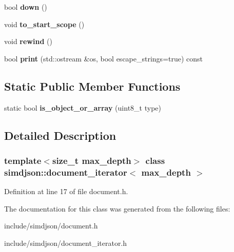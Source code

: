 \begin{DoxyCompactItemize}
bool {\bfseries down} ()
\item 
\mbox{\label{classsimdjson_1_1document__iterator_a369e347c351a3adf4b41c4ecff2de564}} 
void {\bfseries to\+\_\+start\+\_\+scope} ()
\item 
\mbox{\label{classsimdjson_1_1document__iterator_aad93bb4396ac1a2286cc47c6be5288a6}} 
void {\bfseries rewind} ()
\item 
\mbox{\label{classsimdjson_1_1document__iterator_a19140fa45583a78a6a108495861104a2}} 
bool {\bfseries print} (std\+::ostream \&os, bool escape\+\_\+strings=true) const
\end{DoxyCompactItemize}
\subsection*{Static Public Member Functions}
\begin{DoxyCompactItemize}
\item 
\mbox{\label{classsimdjson_1_1document__iterator_a31a57eaef5a0d7c2955b2a9f5a10a86c}} 
static bool {\bfseries is\+\_\+object\+\_\+or\+\_\+array} (uint8\+\_\+t type)
\end{DoxyCompactItemize}


\subsection{Detailed Description}
\subsubsection*{template$<$size\+\_\+t max\+\_\+depth$>$\newline
class simdjson\+::document\+\_\+iterator$<$ max\+\_\+depth $>$}



Definition at line 17 of file document.\+h.



The documentation for this class was generated from the following files\+:\begin{DoxyCompactItemize}
\item 
include/simdjson/document.\+h\item 
include/simdjson/document\+\_\+iterator.\+h\end{DoxyCompactItemize}
